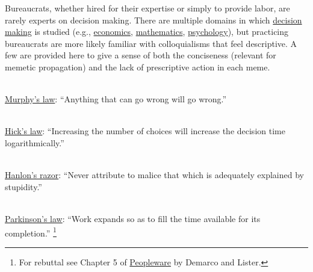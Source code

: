 Bureaucrats, whether hired for their expertise or simply to provide labor, are rarely experts on decision making. There are multiple domains in which \href{https://en.wikipedia.org/wiki/Decision_theory}{decision making}
is studied (e.g., \href{https://en.wikipedia.org/wiki/Rational_choice_theory}{economics}, 
\href{https://en.wikipedia.org/wiki/Game_theory}{mathematics},
\href{https://en.wikipedia.org/wiki/Decision-making}{psychology}),
but practicing bureaucrats are more likely familiar with colloquialisms that feel descriptive. A few are provided here to give a sense of both the conciseness (relevant for memetic propagation) and the lack of prescriptive action in each meme.

\ \\
\href{https://en.wikipedia.org/wiki/Murphy\%27s_law}{Murphy's law}:
``Anything that can go wrong will go wrong.''

\ \\
\href{https://en.wikipedia.org/wiki/Hick\%27s_law}{Hick's law}:
``Increasing the number of choices will increase the decision time logarithmically.''

\ \\
\href{https://en.wikipedia.org/wiki/Hanlon\%27s_razor}{Hanlon's razor}:
``Never attribute to malice that which is adequately explained by stupidity.''

\ \\
\href{https://en.wikipedia.org/wiki/Parkinson\%27s_law}{Parkinson's law}:
``Work expands so as to fill the time available for its completion.''
\footnote{For rebuttal see Chapter 5 of \href{https://en.wikipedia.org/wiki/Peopleware:_Productive_Projects_and_Teams}{Peopleware} by Demarco and Lister\cite{1987_DeMarco}.}


